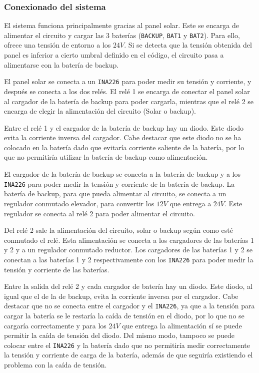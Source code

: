 \subsubsection{Conexionado del sistema}

El sistema funciona principalmente gracias al panel solar. Este se encarga de alimentar el circuito y cargar las 3 baterías (\texttt{BACKUP}, \texttt{BAT1} y \texttt{BAT2}). Para ello, ofrece una tensión de entorno a los $24 V$. Si se detecta que la tensión obtenida del panel es inferior a cierto umbral definido en el código, el circuito pasa a alimentarse con la batería de backup.

El panel solar se conecta a un \texttt{INA226} para poder medir su tensión y corriente, y después se conecta a los dos relés. El relé 1 se encarga de conectar el panel solar al cargador de la batería de backup para poder cargarla, mientras que el relé 2 se encarga de elegir la alimentación del circuito (Solar o backup).

Entre el relé 1 y el cargador de la batería de backup hay un diodo. Este diodo evita la corriente inversa del cargador. Cabe destacar que este diodo no se ha colocado en la batería dado que evitaría corriente saliente de la batería, por lo que no permitiría utilizar la batería de backup como alimentación.

El cargador de la batería de backup se conecta a la batería de backup y a los \texttt{INA226} para poder medir la tensión y corriente de la batería de backup. La batería de backup, para que pueda alimentar al circuito, se conecta a un regulador conmutado elevador, para convertir los $12 V$ que entrega a $24 V$. Este regulador se conecta al relé 2 para poder alimentar el circuito.

Del relé 2 sale la alimentación del circuito, solar o backup según como esté conmutado el relé. Esta alimentación se conecta a los cargadores de las baterías 1 y 2 y a un regulador conmutado reductor. Los cargadores de las baterías 1 y 2 se conectan a las baterías 1 y 2 respectivamente con los \texttt{INA226} para poder medir la tensión y corriente de las baterías.

Entre la salida del relé 2 y cada cargador de batería hay un diodo. Este diodo, al igual que el de la de backup, evita la corriente inversa por el cargador. Cabe destacar que no se conecta entre el cargador y el \texttt{INA226}, ya que a la tensión para cargar la batería se le restaría la caída de tensión en el diodo, por lo que no se cargaría correctamente y para los $24 V$ que entrega la alimentación sí se puede permitir la caída de tensión del diodo. Del mismo modo, tampoco se puede colocar entre el \texttt{INA226} y la batería dado que no permitiría medir correctamente la tensión y corriente de carga de la batería, además de que seguiría existiendo el problema con la caída de tensión.

